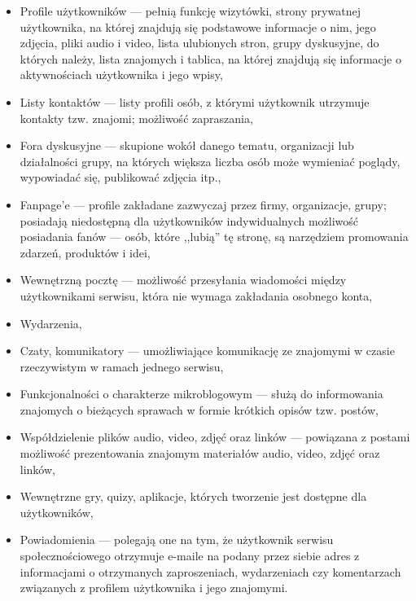 \begin{itemize}
\item Profile użytkowników --- pełnią funkcję wizytówki, strony prywatnej użytkownika, na
której znajdują się podstawowe informacje o nim, jego zdjęcia, pliki audio i video, lista ulubionych stron, grupy dyskusyjne, do których należy, lista znajomych i tablica, na której znajdują się informacje o aktywnościach użytkownika i jego wpisy,

\item Listy kontaktów --- listy profili osób, z którymi użytkownik utrzymuje kontakty tzw. znajomi; możliwość zapraszania,

\item Fora dyskusyjne --- skupione wokół danego tematu, organizacji lub działalności grupy, na których większa liczba osób może wymieniać poglądy, wypowiadać się, publikować zdjęcia itp.,

\item Fanpage’e --- profile zakładane zazwyczaj przez firmy, organizacje, grupy; posiadają niedostępną dla użytkowników indywidualnych możliwość posiadania fanów --- osób, które ,,lubią'' tę stronę, są narzędziem promowania zdarzeń, produktów i idei,

\item Wewnętrzną pocztę --- możliwość przesyłania wiadomości między użytkownikami serwisu, która nie wymaga zakładania osobnego konta,

\item Wydarzenia,

\item Czaty, komunikatory --- umożliwiające komunikację ze znajomymi w czasie rzeczywistym w ramach jednego serwisu,

\item Funkcjonalności o charakterze mikroblogowym --- służą do informowania znajomych o bieżących sprawach w formie krótkich opisów tzw. postów,

\item Współdzielenie plików audio, video, zdjęć oraz linków --- powiązana z postami możliwość prezentowania znajomym materiałów audio, video, zdjęć oraz linków,
            
\item Wewnętrzne gry, quizy, aplikacje, których tworzenie jest dostępne dla użytkowników,

\item Powiadomienia --- polegają one na tym, że użytkownik serwisu społecznościowego otrzymuje e-maile na podany przez siebie adres z informacjami o otrzymanych zaproszeniach, wydarzeniach czy komentarzach związanych z profilem użytkownika i jego znajomymi.
\end{itemize}

